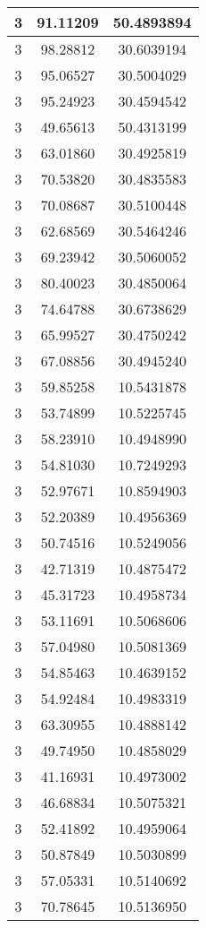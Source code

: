 \documentclass[
]{book}
\begin{document}
\begin{tabular}{c|c|c}
\hline
3 & 91.11209 & 50.4893894\\
\hline
3 & 98.28812 & 30.6039194\\
\hline
3 & 95.06527 & 30.5004029\\
\hline
3 & 95.24923 & 30.4594542\\
\hline
3 & 49.65613 & 50.4313199\\
\hline
3 & 63.01860 & 30.4925819\\
\hline
3 & 70.53820 & 30.4835583\\
\hline
3 & 70.08687 & 30.5100448\\
\hline
3 & 62.68569 & 30.5464246\\
\hline
3 & 69.23942 & 30.5060052\\
\hline
3 & 80.40023 & 30.4850064\\
\hline
3 & 74.64788 & 30.6738629\\
\hline
3 & 65.99527 & 30.4750242\\
\hline
3 & 67.08856 & 30.4945240\\
\hline
3 & 59.85258 & 10.5431878\\
\hline
3 & 53.74899 & 10.5225745\\
\hline
3 & 58.23910 & 10.4948990\\
\hline
3 & 54.81030 & 10.7249293\\
\hline
3 & 52.97671 & 10.8594903\\
\hline
3 & 52.20389 & 10.4956369\\
\hline
3 & 50.74516 & 10.5249056\\
\hline
3 & 42.71319 & 10.4875472\\
\hline
3 & 45.31723 & 10.4958734\\
\hline
3 & 53.11691 & 10.5068606\\
\hline
3 & 57.04980 & 10.5081369\\
\hline
3 & 54.85463 & 10.4639152\\
\hline
3 & 54.92484 & 10.4983319\\
\hline
3 & 63.30955 & 10.4888142\\
\hline
3 & 49.74950 & 10.4858029\\
\hline
3 & 41.16931 & 10.4973002\\
\hline
3 & 46.68834 & 10.5075321\\
\hline
3 & 52.41892 & 10.4959064\\
\hline
3 & 50.87849 & 10.5030899\\
\hline
3 & 57.05331 & 10.5140692\\
\hline
3 & 70.78645 & 10.5136950\\

\end{tabular}
\end{document}
